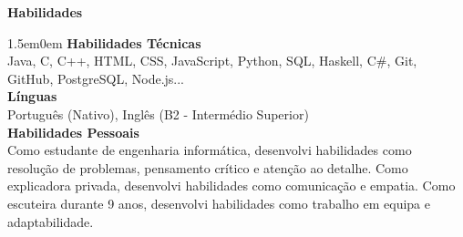 \noindent\textbf{Habilidades}
\noindent\hrulefill
\vspace{0.25em}
\begin{adjustwidth}{1.5em}{0em}
\textbf{Habilidades Técnicas}\\
Java, C, C++, HTML, CSS, JavaScript, Python, SQL, Haskell, C\#, Git, GitHub, PostgreSQL, Node.js...
\vspace{0.5em}
\\
\textbf{Línguas}\\
Português (Nativo), Inglês (B2 - Intermédio Superior)
\vspace{0.5em}
\\
\textbf{Habilidades Pessoais}\\
Como estudante de engenharia informática, desenvolvi habilidades como resolução de problemas, pensamento crítico e atenção ao detalhe.
Como explicadora privada, desenvolvi habilidades como comunicação e empatia.
Como escuteira durante 9 anos, desenvolvi habilidades como trabalho em equipa e adaptabilidade.
\end{adjustwidth}
\vspace{0.25em}
